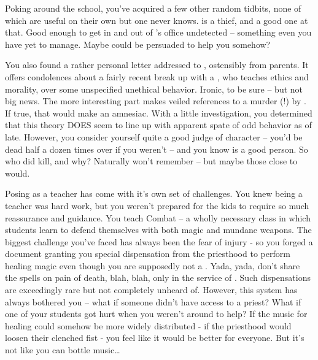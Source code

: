 \documentclass[char]{GL2020}
\begin{document}
Poking around the school, you’ve acquired a few other random tidbits, none of which are useful on their own but one never knows. \cPirateChild{} is a thief, and a good one at that. Good enough to get in and out of \cChupInventor{}’s office undetected -- something even you have yet to manage. Maybe \cPirateChild{} could be persuaded to help you somehow? 

You also found a rather personal letter addressed to \cLibrarian{}, ostensibly from \cLibrarian{\their} parents. It offers condolences about a fairly recent break up with a \cEthics{}, who teaches ethics and morality, over some unspecified unethical behavior. Ironic, to be sure -- but not big news. The more interesting part makes veiled references to a murder (!) by \cLibrarian{}. If true, that would make \cLibrarian{} an amnesiac. With a little investigation, you determined that this theory DOES seem to line up with \cLibrarian{\their} apparent spate of odd behavior as of late. However, you consider yourself quite a good judge of character -- you’d be dead half a dozen times over if you weren’t -- and you know \cLibrarian{} is a good person. So who did \cLibrarian{} kill, and why? Naturally \cLibrarian{} won’t remember -- but maybe those close to \cLibrarian{\them} would.

Posing as a teacher has come with it’s own set of challenges. You knew being a teacher was hard work, but you weren’t prepared for the kids to require so much reassurance and guidance. You teach Combat -- a wholly necessary class in which students learn to defend themselves with both magic and mundane weapons. The biggest challenge you’ve faced has always been the fear of injury - so you forged a document granting you special dispensation from the priesthood to perform healing magic even though you are supposedly not a \cInterpol{\cleric}. Yada, yada, don’t share the spells on pain of death, blah, blah, only in the service of \cFarmGod{}. Such dispensations are exceedingly rare but not completely unheard of. However, this system has always bothered you -- what if someone didn’t have access to a priest? What if one of your students got hurt when you weren’t around to help? If the music for healing could somehow be more widely distributed - if the priesthood would loosen their clenched fist - you feel like it would be better for everyone. But it’s not like you can bottle music\ldots
\end{document}
